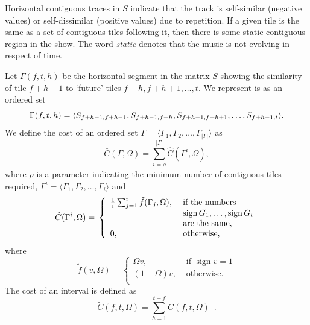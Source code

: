 \documentclass[twocolumn]{article}
\newcommand{\sign}{\mathop{\mathrm{sign}}}
\begin{document}
	
Horizontal contiguous traces in $S$ indicate that the track is
self-similar (negative values) or self-dissimilar (positive values)
due to repetition. If a given tile is the same as a set of contiguous
tiles following it, then there is some static contiguous region in the
show. The word \textit{static} denotes that the music is not evolving in
respect of time.

Let $\Gamma(f,t,h)$ be the horizontal segment in the matrix $S$
showing the similarity of tile $f+h-1$ to `future' tiles $f+h,
f+h+1,\ldots, t$. We represent is as an ordered set
\begin{dmath*}
\Gamma(f,t,h) =  \langle S_{f+h-1,f+h-1}, S_{f+h-1,f+h}, S_{f+h-1,f+h+1},\ldots,\\
S_{f+h-1,t}\rangle.
\end{dmath*} 
We define the cost of an ordered set $\Gamma=\langle
\Gamma_1,\Gamma_2,\ldots,\Gamma_{|\Gamma|}\rangle$ as
$$
\bar C(\Gamma,\Omega)=\sum_{i=\rho}^{|\Gamma|}\hat C(\Gamma^i,\Omega),
$$ 
where $\rho$ is a parameter indicating the minimum number of
contiguous tiles required, $\Gamma^i=\langle
\Gamma_1,\Gamma_2,\ldots,\Gamma_i\rangle$ and
\begin{dmath*}
\hat C(\Gamma^i,\Omega)=\\ \left\{
\begin{array}{ll}
\frac{1}{i}\sum_{j=1}^i\tilde{f}(\Gamma_j,\Omega),&
 \text{~if the numbers~} \\
& ~\sign{G_1},\ldots,\sign{G_i}\\
& \text{~are the same},\\
0, & \text{~otherwise},
\end{array}
\right.
\end{dmath*}
where
\begin{dmath*}
\tilde{f}(v,\Omega) = \left\{ 
	\begin{array}{lr}
		\Omega v, & \text{~if~} \sign v=1 \\
		(1-\Omega) v, & \mbox{~otherwise.}    \\
	\end{array}
	\right.
\end{dmath*}
The cost of an interval is defined as
\begin{dmath*}
\tilde C(f,t,\Omega) = \sum_{h=1}^{t-f}\bar C(f,t,\Omega)\enspace.
\end{dmath*}



\end{document}
